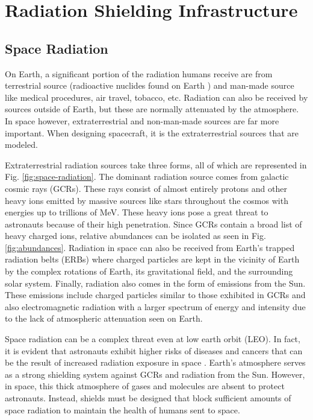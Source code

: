 \section{Radiation Shielding Infrastructure}

\subsection{Space Radiation}

On Earth, a significant portion of the radiation humans receive are from terrestrial source (radioactive nuclides found on Earth \cite{lamarsh}) and man-made source like medical procedures, air travel, tobacco, etc. Radiation can also be received by sources outside of Earth, but these are normally attenuated by the atmosphere. In space however, extraterrestrial and non-man-made sources are far more important. When designing spacecraft, it is the extraterrestrial sources that are modeled.

Extraterrestrial radiation sources take three forms, all of which are represented in Fig. \ref{fig:space-radiation}. The dominant radiation source comes from galactic cosmic rays (GCRs). These rays consist of almost entirely protons and other heavy ions emitted by massive sources like stars throughout the cosmos with energies up to trillions of MeV. These heavy ions pose a great threat to astronauts because of their high penetration. Since GCRs contain a broad list of heavy charged ions, relative abundances can be isolated as seen in Fig. \ref{fig:abundances}. Radiation in space can also be received from Earth’s trapped radiation belts (ERBs) where charged particles are kept in the vicinity of Earth by the complex rotations of Earth, its gravitational field, and the surrounding solar system. Finally, radiation also comes in the form of emissions from the Sun. These emissions include charged particles similar to those exhibited in GCRs and also electromagnetic radiation with a larger spectrum of energy and intensity due to the lack of atmospheric attenuation seen on Earth.

Space radiation can be a complex threat even at low earth orbit (LEO). In fact, it is evident that astronauts exhibit higher risks of diseases and cancers that can be the result of increased radiation exposure in space \cite{nature-apollo}. Earth’s atmosphere serves as a strong shielding system against GCRs and radiation from the Sun. However, in space, this thick atmosphere of gases and molecules are absent to protect astronauts. Instead, shields must be designed that block sufficient amounts of space radiation to maintain the health of humans sent to space.

